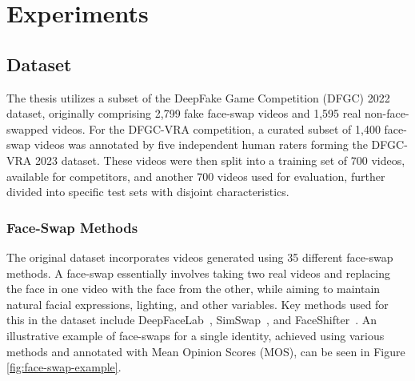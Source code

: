 \documentclass[a4paper,12pt,openright]{book}
\begin{document}
\chapter{Experiments}
\label{chap:experiments}
\section{Dataset}
The thesis utilizes a subset of the DeepFake Game Competition (DFGC) 2022 dataset, originally comprising 2,799 fake face-swap videos and 1,595 real non-face-swapped videos. For the DFGC-VRA competition, a curated subset of 1,400 face-swap videos was annotated by five independent human raters forming the DFGC-VRA 2023 dataset. These videos were then split into a training set of 700 videos, available for competitors, and another 700 videos used for evaluation, further divided into specific test sets with disjoint characteristics.

\subsection{Face-Swap Methods}

The original dataset incorporates videos generated using 35 different face-swap methods. A face-swap essentially involves taking two real videos and replacing the face in one video with the face from the other, while aiming to maintain natural facial expressions, lighting, and other variables. Key methods used for this in the dataset include DeepFaceLab~\cite{DBLP:journals/corr/abs-2005-05535}, SimSwap~\cite{DBLP:journals/corr/abs-2106-06340}, and FaceShifter~\cite{DBLP:journals/corr/abs-1912-13457}. An illustrative example of face-swaps for a single identity, achieved using various methods and annotated with Mean Opinion Scores (MOS), can be seen in Figure \ref{fig:face-swap-example}.
\end{document}
